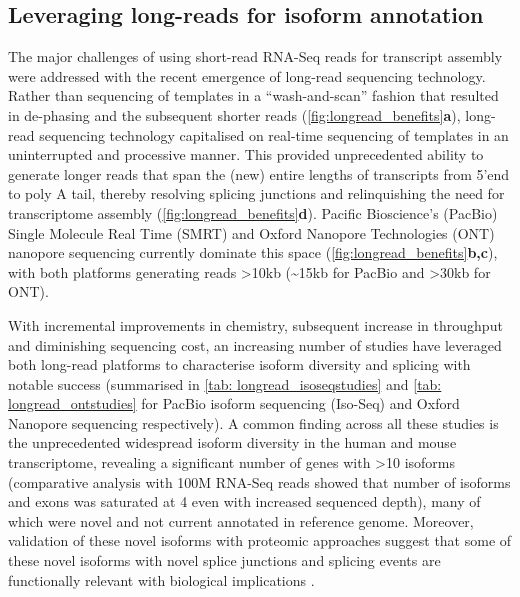 

\subsection{Leveraging long-reads for isoform annotation}
The major challenges of using short-read RNA-Seq reads for transcript assembly were addressed with the recent emergence of long-read sequencing technology. Rather than sequencing of templates in a “wash-and-scan” fashion that resulted in de-phasing and the subsequent shorter reads (\cref{fig:longread_benefits}\textbf{a}), long-read sequencing technology capitalised on real-time sequencing of templates in an uninterrupted and processive manner. This provided unprecedented ability to generate longer reads that span the (new) entire lengths of transcripts from 5'end to poly A tail, thereby resolving splicing junctions and relinquishing the need for transcriptome assembly (\cref{fig:longread_benefits}\textbf{d}). Pacific Bioscience's (PacBio) Single Molecule Real Time (SMRT) and Oxford Nanopore Technologies (ONT) nanopore sequencing currently dominate this space (\cref{fig:longread_benefits}\textbf{b,c}), with both platforms generating reads >10kb (\textasciitilde15kb for PacBio and >30kb for ONT). 

With incremental improvements in chemistry, subsequent increase in throughput and diminishing sequencing cost, an increasing number of studies have leveraged both long-read platforms to characterise isoform diversity and splicing with notable success (summarised in \cref{tab: longread_isoseqstudies} and \cref{tab: longread_ontstudies} for PacBio isoform sequencing (Iso-Seq) and Oxford Nanopore sequencing respectively). A common finding across all these studies is the unprecedented widespread isoform diversity in the human \cite{Sharon2013, Au2013,Tseng2019,DeslattesMays2019} and mouse transcriptome, revealing a significant number of genes with >10 isoforms (comparative analysis with 100M RNA-Seq reads showed that number of isoforms and exons was saturated at 4 even with increased sequenced depth\cite{DeslattesMays2019}), many of which were novel and not current annotated in reference genome. Moreover, validation of these novel isoforms with proteomic approaches suggest that some of these novel isoforms with novel splice junctions and splicing events are functionally relevant with biological implications \cite{Huang2021}. 


